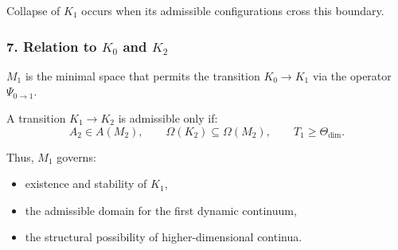 Collapse of $K_1$ occurs when its admissible configurations cross this boundary.

\subsubsection*{7. Relation to \texorpdfstring{$K_0$}{K_0} and \texorpdfstring{$K_2$}{K_2}}

$M_1$ is the minimal space that permits the transition $K_0 \to K_1$ via the operator $\Psi_{0\to1}$.

A transition $K_1 \to K_2$ is admissible only if:
\[
A_2 \in A(M_2),\qquad
\Omega(K_2) \subseteq \Omega(M_2),\qquad
T_1 \ge \Theta_{\text{dim}}.
\]

Thus, $M_1$ governs:

\begin{itemize}
    \item existence and stability of $K_1$,
    \item the admissible domain for the first dynamic continuum,
    \item the structural possibility of higher-dimensional continua.
\end{itemize}

